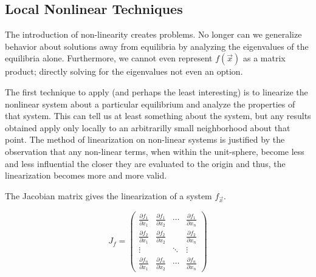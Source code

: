 \documentclass{elsart}
\begin{document}

\subsection{ Local Nonlinear Techniques }
The introduction of non-linearity creates problems.  No longer can we
generalize behavior about solutions away from equilibria by analyzing the
eigenvalues of the equilibria alone.  Furthermore, we cannot even
represent $f(\vec{x})$ as a matrix product; directly solving for
the eigenvalues not even an option.

The first technique to apply (and perhaps the least interesting) is to
linearize the nonlinear system about a particular equilibrium and analyze
the properties of that system.  This can tell us at least something about
the system, but any results obtained apply only locally to an 
arbitrarilly small neighborhood about that point.
The method of linearization on non-linear systems is justified by 
the observation
that any non-linear terms, when within the unit-sphere, become less and
less influential the closer they are evaluated to the origin and thus, the
linearization becomes more and more valid.

The Jacobian matrix gives the linearization of a system $f_{\vec{x}}$.

\[ J_{f} = \left( \begin{array}{cccc}

\frac{\partial f_{1}}{\partial x_{1}} & 
\frac{\partial f_{1}}{\partial x_{2}} & 
\cdots &
\frac{\partial f_{1}}{\partial x_{n}} \\

\frac{\partial f_{2}}{\partial x_{1}} & 
\frac{\partial f_{2}}{\partial x_{2}} & 
 &
\frac{\partial f_{2}}{\partial x_{n}} \\

\vdots & & \ddots & \vdots \\


\frac{\partial f_{n}}{\partial x_{1}} & 
\frac{\partial f_{n}}{\partial x_{2}} & 
\cdots &
\frac{\partial f_{n}}{\partial x_{n}} \end{array} \right)\] 
\end{document}
